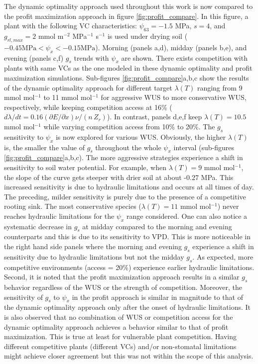 \documentclass[utf8]{frontiersSCNS} %
\begin{document}
The dynamic optimality approach used throughout this work is now compared to the profit maximization approach in figure \ref{fig:profit_compare}. In this figure, a plant with the following VC characteristics: $\psi_{63} = -1.5$ MPa, $s=4$, and $g_{rl,max} = 2$ mmol m$^{-2}$ MPa$^{-1}$ s$^{-1}$ is used under drying soil ($-0.45 \text{MPa} < \psi_x < -0.15 \text{MPa}$). Morning (panels a,d), midday (panels b,e), and evening (panels c,f) $g_s$ trends with $\psi_x$ are shown. There exists competition with plants with same VCs as the one modeled in these dynamic optimality and profit maximization simulations. Sub-figures \ref{fig:profit_compare}a,b,c show the results of the dynamic optimality approach for different target $\lambda(T)$ ranging from 9 mmol mol$^{-1}$ to 11 mmol mol$^{-1}$ for aggressive WUS to more conservative WUS, respectively, while keeping competition access at 16\% ($d\lambda/dt = 0.16 (\partial E / \partial x) \nu/(n\, Z_r) $). In contrast, panels d,e,f keep $\lambda(T)=10.5$ mmol mol$^{-1}$ while varying competition access from 10\% to 20\%.
The $g_s$ sensitivity to $\psi_x$ is now explored for various WUS. Obviously, the higher $\lambda(T)$ is, the smaller the value of $g_s$ throughout the whole $\psi_x$ interval (sub-figures \ref{fig:profit_compare}a,b,c). The more aggressive strategies experience a shift in sensitivity to soil water potential. For example, when $\lambda(T)=9$ mmol mol$^{-1}$, the slope of the curve gets steeper with drier soil at about -0.27 MPa. This increased sensitivity is due to hydraulic limitations and occurs at all times of day. The preceding, milder sensitivity is purely due to the presence of a competitive rooting sink. The most conservative species ($\lambda(T) = 11$ mmol mol$^{-1}$) never reaches hydraulic limitations for the $\psi_x$ range considered. One can also notice a systematic decrease in $g_s$ at midday compared to the morning and evening counterparts and this is due to its sensitivity to VPD. This is more noticeable in the right hand side panels where the morning and evening $g_s$ experience a shift in sensitivity due to hydraulic limitations but not the midday $g_s$. As expected, more competitive environments (access = 20\%) experience earlier hydraulic limitations.
Second, it is noted that the profit maximization approach results in a similar $g_s$ behavior regardless of the WUS or the strength of competition. Moreover, the sensitivity of $g_s$ to $\psi_x$ in the profit approach is similar in magnitude to that of the dynamic optimality approach only after the onset of hydraulic limitations. It is also observed that no combination of WUS or competition access for the dynamic optimality approach achieves a behavior similar to that of profit maximization. This is true at least for vulnerable plant competition. Having different competitive plants (different VCs) and/or non-stomatal limitations might achieve closer agreement but this was not within the scope of this analysis. 
\end{document}
